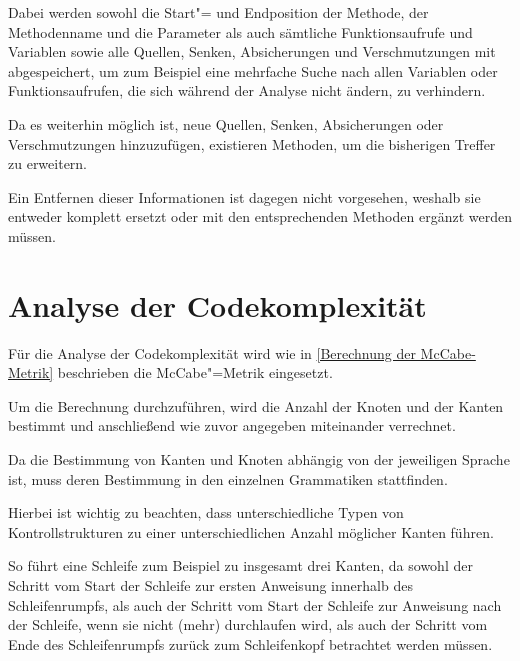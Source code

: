             Dabei werden sowohl die Start"= und
            Endposition der Methode,
            der Methodenname und
            die Parameter als auch sämtliche Funktionsaufrufe und
            Variablen sowie
            alle Quellen,
            Senken,
            Absicherungen und
            Verschmutzungen mit abgespeichert,
            um zum Beispiel eine mehrfache Suche nach allen Variablen oder
            Funktionsaufrufen,
            die sich während der Analyse nicht ändern,
            zu verhindern.

            Da es weiterhin möglich ist,
            neue Quellen,
            Senken,
            Absicherungen oder
            Verschmutzungen hinzuzufügen,
            existieren Methoden,
            um die bisherigen Treffer zu erweitern.

            Ein Entfernen dieser Informationen ist dagegen nicht vorgesehen,
            weshalb sie entweder komplett ersetzt oder
            mit den entsprechenden Methoden ergänzt werden müssen.

    \section{Analyse der Codekomplexität}\label{Analyse der Codekomplexität}
        Für die Analyse der Codekomplexität wird wie in
        \vref{Berechnung der McCabe-Metrik} beschrieben die McCabe"=Metrik eingesetzt.

        Um die Berechnung durchzuführen,
        wird die Anzahl der Knoten und
        der Kanten bestimmt und
        anschließend wie zuvor angegeben miteinander verrechnet.

        Da die Bestimmung von Kanten und
        Knoten abhängig von der jeweiligen Sprache ist,
        muss deren Bestimmung in den einzelnen Grammatiken stattfinden.

        Hierbei ist wichtig zu beachten,
        dass unterschiedliche Typen von Kontrollstrukturen zu einer unterschiedlichen Anzahl möglicher Kanten führen.

        So führt eine Schleife zum Beispiel zu insgesamt drei Kanten,
        da sowohl der Schritt vom Start der Schleife zur ersten Anweisung innerhalb des Schleifenrumpfs,
        als auch der Schritt vom Start der Schleife zur Anweisung nach der Schleife,
        wenn sie nicht
        (mehr) durchlaufen wird,
        als auch der Schritt vom Ende des Schleifenrumpfs zurück zum Schleifenkopf betrachtet werden müssen.

